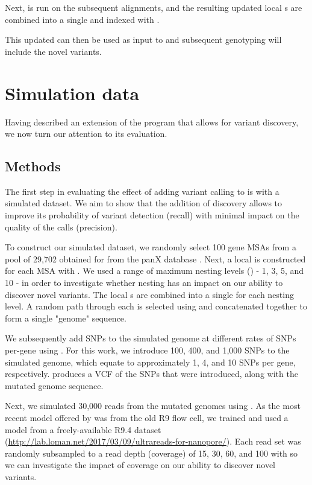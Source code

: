 Next, \makeprg{} is run on the subsequent alignments, and the resulting updated local \prg{}s are combined into a single \panrg{} and indexed with \pandora{}. 

This updated \panrg{} can then be used as input to \pandora{} and subsequent genotyping will include the novel variants.

\section{Simulation data}
\label{sec:denovo-sims}
Having described an extension of the \pandora{} program that allows for \denovo{} variant discovery, we now turn our attention to its evaluation.

\subsection{Methods}
\label{sec:denovo-sims-methods}

The first step in evaluating the effect of adding \denovo{} variant calling to \pandora{} is with a simulated dataset. We aim to show that the addition of \denovo{} discovery allows \pandora{} to improve its probability of variant detection (recall) with minimal impact on the quality of the calls (precision). 

To construct our simulated dataset, we randomly select 100 gene MSAs from a pool of 29,702 obtained for \ecoli{} from the panX database \cite{panx}. Next, a local \prg{} is constructed for each MSA with \makeprg{}. We used a range of maximum nesting levels () - 1, 3, 5, and 10 - in order to investigate whether \prg{} nesting has an impact on our ability to discover novel variants. The local \prg{}s are combined into a single \panrg{} for each nesting level. A random path through each \prg{} is selected using \pandora{} and concatenated together to form a single "genome" sequence. 

We subsequently add SNPs to the simulated genome at different rates of SNPs per-gene using  \cite{snpmutator}. For this work, we introduce 100, 400, and 1,000 SNPs to the simulated genome, which equate to approximately 1, 4, and 10 SNPs per gene, respectively.  produces a VCF of the SNPs that were introduced, along with the mutated genome sequence.

Next, we simulated 30,000 \ont{} reads from the mutated genomes using  \cite{yang2017,brinda2018}. As the most recent model offered by  was from the old R9 \ont{} flow cell, we trained and used a model from a freely-available \ecoli{} R9.4 dataset (\url{http://lab.loman.net/2017/03/09/ultrareads-for-nanopore/}). Each read set was randomly subsampled to a read depth (coverage) of 15, 30, 60, and 100 with  \cite{rasusa2019} so we can investigate the impact of coverage on our ability to discover novel variants.

